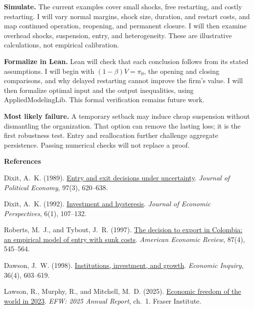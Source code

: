 \documentclass[11pt,letterpaper]{article}
\begin{document}
\textbf{Simulate.} The current examples cover small shocks, free restarting,
and costly restarting. I will vary normal margins, shock size,
duration, and restart costs, and map continued operation, reopening, and permanent
closure. I will then examine overhead shocks, suspension, entry, and heterogeneity.
These are illustrative calculations, not empirical calibration.

\textbf{Formalize in Lean.} Lean will check that each conclusion follows from
its stated assumptions. I will begin with $(1-\beta)V=\pi_0$, the opening and
closing comparisons, and why delayed restarting cannot improve the firm's value.
I will then formalize optimal input and the output inequalities, using
AppliedModelingLib. This formal verification remains future work.

\textbf{Most likely failure.} A temporary setback may induce cheap suspension
without dismantling the organization. That option can remove the lasting loss;
it is the first robustness test. Entry and reallocation further challenge
aggregate persistence. Passing numerical checks will not replace a proof.

{\footnotesize\raggedright
\textbf{References}\par\setlength{\parskip}{2pt}
\hypertarget{ref:dixit}{}Dixit, A.~K. (1989).
\href{https://doi.org/10.1086/261619}{Entry and exit decisions under uncertainty}.
\emph{Journal of Political Economy}, 97(3), 620--638.\par
\hypertarget{ref:dixit1992}{}Dixit, A.~K. (1992).
\href{https://doi.org/10.1257/jep.6.1.107}{Investment and hysteresis}.
\emph{Journal of Economic Perspectives}, 6(1), 107--132.\par
\hypertarget{ref:roberts}{}Roberts, M.~J., and Tybout, J.~R. (1997).
\href{https://pure.psu.edu/en/publications/the-decision-to-export-in-colombia-an-empirical-model-of-entry-wi/}{The decision to export in Colombia: an empirical model of entry with sunk costs}.
\emph{American Economic Review}, 87(4), 545--564.\par
\hypertarget{ref:dawson}{}Dawson, J.~W. (1998).
\href{https://doi.org/10.1111/j.1465-7295.1998.tb01739.x}{Institutions, investment, and growth}.
\emph{Economic Inquiry}, 36(4), 603--619.\par
\hypertarget{ref:efw}{}Lawson, R., Murphy, R., and Mitchell, M.~D. (2025).
\href{https://www.cato.org/sites/cato.org/files/2025-09/economic-freedom-of-the-world-2025-chapter-1.pdf}{Economic freedom of the world in 2023}.
\emph{EFW: 2025 Annual Report}, ch.~1. Fraser Institute.
}
\end{document}
